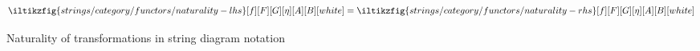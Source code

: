 \begin{figure}
    \begin{gather*}
        \iltikzfig{strings/category/functors/naturality-lhs}[f][F][G][\eta][A][B][white]
        =
        \iltikzfig{strings/category/functors/naturality-rhs}[f][F][G][\eta][A][B][white]
    \end{gather*}
    \caption{
        Naturality of transformations in string diagram notation
    }
    \label{fig:naturality-equations}
\end{figure}